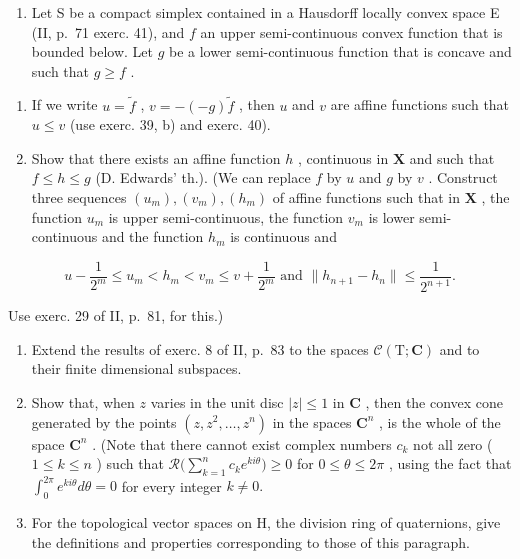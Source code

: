 \begin{enumerate}
\def\labelenumi{\arabic{enumi})}
\setcounter{enumi}{40}
\tightlist
\item
  Let S be a compact simplex contained in a Hausdorff locally convex space E (II, p.~71 exerc. 41), and \(f\) an upper semi-continuous convex function that is bounded below. Let \(g\) be a lower semi-continuous function that is concave and such that \(g \geqslant f\) .
\end{enumerate}

\begin{enumerate}
\def\labelenumi{\alph{enumi})}
\item
  If we write \(u = \tilde{f}\) , \(v = -(-g)\tilde{f}\) , then \(u\) and \(v\) are affine functions such that \(u \leqslant v\) (use exerc. 39, b) and exerc. 40).
\item
  Show that there exists an affine function \(h\) , continuous in \(\mathbf{X}\) and such that \(f \leqslant h \leqslant g\) (D. Edwards' th.). (We can replace \(f\) by \(u\) and \(g\) by \(v\) . Construct three sequences \((u_m), (v_m), (h_m)\) of affine functions such that in \(\mathbf{X}\) , the function \(u_m\) is upper semi-continuous, the function \(v_m\) is lower semi-continuous and the function \(h_m\) is continuous and
\end{enumerate}

\[
u - \frac {1}{2 ^ {m}} \leqslant u _ {m} <   h _ {m} <   v _ {m} \leqslant v + \frac {1}{2 ^ {m}} \text { and } \| h _ {n + 1} - h _ {n} \| \leqslant \frac {1}{2 ^ {n + 1}}.
\]

Use exerc. 29 of II, p.~81, for this.)

\exercisegroup

\begin{enumerate}
\def\labelenumi{\arabic{enumi})}
\item
  Extend the results of exerc. 8 of II, p.~83 to the spaces \(\mathcal{C}(\mathrm{T};\mathbf{C})\) and to their finite dimensional subspaces.
\item
  Show that, when \(z\) varies in the unit disc \(|z| \leqslant 1\) in \(\mathbf{C}\) , then the convex cone generated by the points \((z, z^2, \dots, z^n)\) in the spaces \(\mathbf{C}^n\) , is the whole of the space \(\mathbf{C}^n\) . (Note that there cannot exist complex numbers \(c_k\) not all zero ( \(1 \leqslant k \leqslant n\) ) such that \(\mathcal{R}\big(\sum_{k=1}^{n} c_k e^{ki\theta}\big) \geqslant 0\) for \(0 \leqslant \theta \leqslant 2\pi\) , using the fact that \(\int_0^{2\pi}e^{ki\theta}d\theta = 0\) for every integer \(k\neq 0.\)
\item
  For the topological vector spaces on H, the division ring of quaternions, give the definitions and properties corresponding to those of this paragraph.
\end{enumerate}

